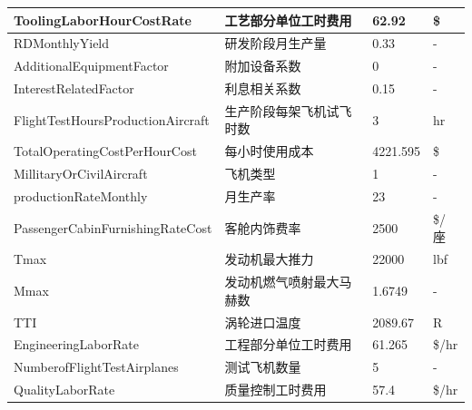 \documentclass[12pt,a4paper]{report}
\begin{document}
\begin{center}
\begin{longtable}{|p{5.8cm}|p{3.9cm}|p{1.9cm}|p{1.4cm}|}
ToolingLaborHourCostRate &  工艺部分单位工时费用 &62.92&\$\\\hline
RDMonthlyYield & 研发阶段月生产量 &0.33&-\\\hline
AdditionalEquipmentFactor&附加设备系数 & 0& -\\\hline
InterestRelatedFactor& 利息相关系数& 0.15&-\\\hline
FlightTestHoursProductionAircraft & 生产阶段每架飞机试飞时数 & 3&hr\\\hline
TotalOperatingCostPerHourCost & 每小时使用成本 & 4221.595&\$\\\hline
MillitaryOrCivilAircraft &飞机类型  & 1&-\\\hline
productionRateMonthly &月生产率  & 23&-\\\hline
PassengerCabinFurnishingRateCost & 客舱内饰费率 & 2500&\$/座\\\hline
Tmax &发动机最大推力  & 22000&lbf\\\hline
Mmax & 发动机燃气喷射最大马赫数 & 1.6749&-\\\hline
TTI & 涡轮进口温度 &2089.67&R\\\hline
EngineeringLaborRate &工程部分单位工时费用  & 61.265&\$/hr\\\hline
NumberofFlightTestAirplanes &测试飞机数量  & 5&-\\\hline
QualityLaborRate & 质量控制工时费用 & 57.4&\$/hr\\\hline
\hline
\end{longtable}
\end{center}
\end{document}

